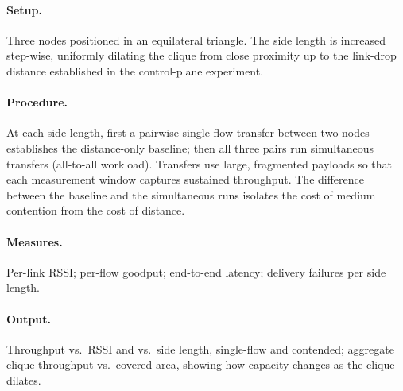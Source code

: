 \paragraph{Setup.} Three nodes positioned in an equilateral triangle. The side length
is increased step-wise, uniformly dilating the clique from close proximity up to the
link-drop distance established in the control-plane experiment.

\paragraph{Procedure.} At each side length, first a pairwise single-flow transfer
between two nodes establishes the distance-only baseline; then all three pairs run
simultaneous transfers (all-to-all workload). Transfers use large, fragmented
payloads so that each measurement window captures sustained throughput. The
difference between the baseline and the simultaneous runs isolates the cost of
medium contention from the cost of distance.

\paragraph{Measures.} Per-link RSSI; per-flow goodput; end-to-end latency; delivery
failures per side length.

\paragraph{Output.} Throughput vs.\ RSSI and vs.\ side length, single-flow and
contended; aggregate clique throughput vs.\ covered area, showing how capacity
changes as the clique dilates.

